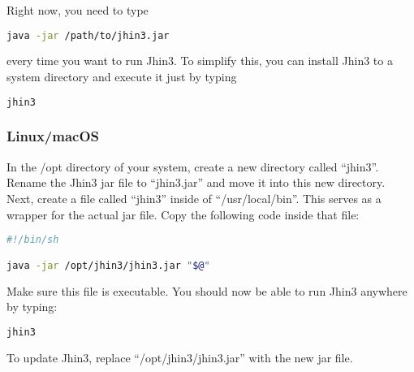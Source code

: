 Right now, you need to type
\begin{lstlisting}[language=bash]
java -jar /path/to/jhin3.jar
\end{lstlisting}
every time you want to run Jhin3. To simplify this, you can install Jhin3 to a system directory and execute it just by typing
\begin{lstlisting}[language=bash]
jhin3
\end{lstlisting}

\subsubsection{Linux/macOS}

In the /opt directory of your system, create a new directory called ``jhin3''. Rename the Jhin3 jar file to ``jhin3.jar'' and move it into this new directory.
Next, create a file called ``jhin3'' inside of ``/usr/local/bin''. This serves as a wrapper for the actual jar file.
Copy the following code inside that file:

\begin{lstlisting}[language=bash]
#!/bin/sh

java -jar /opt/jhin3/jhin3.jar "$@"
\end{lstlisting}

Make sure this file is executable. You should now be able to run Jhin3 anywhere by typing:
\begin{lstlisting}[language=bash]
jhin3
\end{lstlisting}

To update Jhin3, replace ``/opt/jhin3/jhin3.jar'' with the new jar file.
